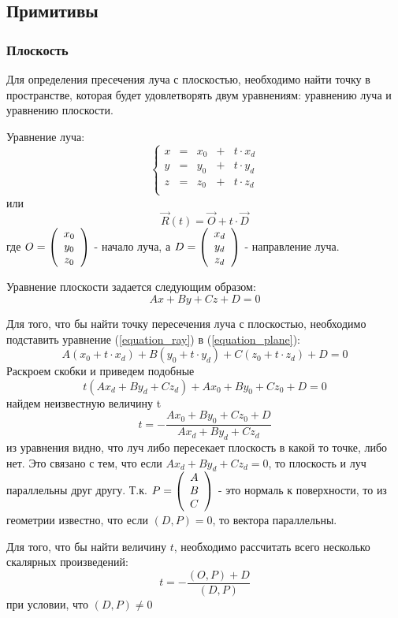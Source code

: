 
\subsection{Примитивы}
\subsubsection{Плоскость}
Для определения пресечения луча с плоскостью, необходимо найти точку в пространстве, которая будет удовлетворять двум уравнениям: уравнению луча и уравнению плоскости.
\par
Уравнение луча:
\begin{equation}
\left\{
\begin{array}{ccccc}
x & = & x_0 & + & t \cdot x_d \\
y & = & y_0 & + & t \cdot y_d \\
z & = & z_0 & + & t \cdot z_d \\
\end{array}
\right.
\label{equation_ray}
\end{equation}
или
$$
\vec{R}(t) = \vec{O} + t \cdot \vec{D}
$$
где $O = \left( \begin{array}{c} x_0 \\ y_0 \\ z_0 \end{array} \right) $ - начало луча, а $D = \left( \begin{array}{c} x_d \\ y_d \\ z_d \end{array} \right) $ - направление луча. 
\par
Уравнение плоскости задается следующим образом:
\begin{equation}
Ax + By + Cz + D = 0
\label{equation_plane}
\end{equation}
\par
Для того, что бы найти точку пересечения луча с плоскостью, необходимо подставить уравнение (\ref{equation_ray}) в (\ref{equation_plane}):
$$
A(x_0 + t \cdot x_d) + B(y_0 + t \cdot y_d) + C(z_0 + t \cdot z_d) + D = 0
$$
Раскроем скобки и приведем подобные
$$
t(Ax_d + By_d + Cz_d ) + Ax_0 + By_0 + Cz_0 + D = 0
$$
найдем неизвестную величину t
$$
 t = - \frac{Ax_0 + By_0 + Cz_0 + D}{Ax_d + By_d + Cz_d}
$$
из уравнения видно, что луч либо пересекает плоскость в какой то точке, либо нет. Это связано с тем, что если $Ax_d + By_d + Cz_d = 0$, то плоскость и луч параллельны друг другу. Т.к. $P = \left( \begin{array}{c} A \\ B \\ C \end{array} \right) $ - это нормаль к поверхности, то из геометрии известно, что если $( D , P ) = 0$, то вектора параллельны.
\par
   Для того, что бы найти величину $t$, необходимо рассчитать всего несколько скалярных произведений:
$$
t = - \frac{(O, P) + D}{(D, P)}
$$
при условии, что $(D, P) \neq 0$


